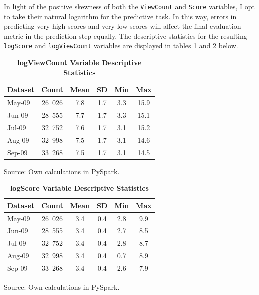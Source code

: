 \documentclass[11pt,preprint, authoryear]{article}
\begin{document}
In light of the positive skewness of both the \texttt{ViewCount} and
\texttt{Score} variables, I opt to take their natural logarithm for the
predictive task. In this way, errors in predicting very high scores and
very low scores will affect the final evaluation metric in the
prediction step equally. The descriptive statistics for the resulting
\texttt{logScore} and \texttt{logViewCount} variables are displayed in
tables \ref{tab:viewcl_desc} and \ref{tab:scorel_desc} below.

\newpage

\footnotesize

\begin{longtable} {@{} lccccc @{}}
\caption{\textbf{logViewCount Variable Descriptive Statistics}}
\label{tab:viewcl_desc}\\ 
\toprule
\textbf{Dataset} & \textbf{Count} & \textbf{Mean} & \textbf{SD} & \textbf{Min} & \textbf{Max} \\ 
\midrule
May-09 &  26\ 026 &   7.8 &     1.7 &  3.3 &  15.9 \\
Jun-09 &  28\ 555 &   7.7 &     1.7 &  3.3 &  15.1 \\
Jul-09 &  32\ 752 &   7.6 &     1.7 &  3.1 &  15.2 \\
Aug-09 &  32\ 998 &   7.5 &     1.7 &  3.1 &  14.6 \\
Sep-09 &  33\ 268 &   7.5 &     1.7 &  3.1 &  14.5 \\
\bottomrule
\end{longtable}\begin{center} Source: Own calculations in PySpark.\end{center}

\normalsize

\footnotesize

\begin{longtable} {@{} lccccc @{}}
\caption{\textbf{logScore Variable Descriptive Statistics}}
\label{tab:scorel_desc}\\ 
\toprule
\textbf{Dataset} & \textbf{Count} & \textbf{Mean} & \textbf{SD} & \textbf{Min} & \textbf{Max} \\ 
\midrule
May-09 &  26\ 026 &   3.4 &     0.4 &  2.8 &  9.9 \\
Jun-09 &  28\ 555 &   3.4 &     0.4 &  2.7 &  8.5 \\
Jul-09 &  32\ 752 &   3.4 &     0.4 &  2.8 &  8.7 \\
Aug-09 &  32\ 998 &   3.4 &     0.4 &  0.7 &  8.9 \\
Sep-09 &  33\ 268 &   3.4 &     0.4 &  2.6 &  7.9 \\
\bottomrule
\end{longtable}\begin{center} Source: Own calculations in PySpark.\end{center}
\end{document}
